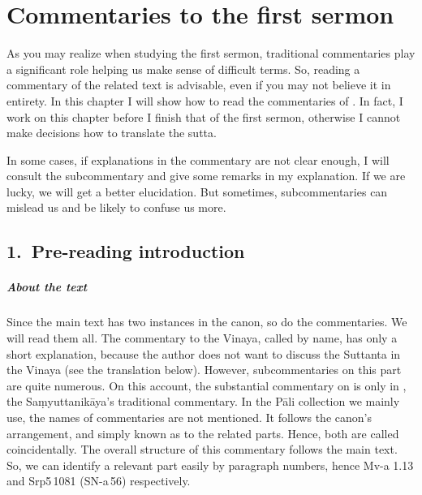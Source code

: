 \chapter{Commentaries to the first sermon}\label{chap:comcak}

As you may realize when studying the first sermon, traditional commentaries play a significant role helping us make sense of difficult terms. So, reading a commentary of the related text is advisable, even if you may not believe it in entirety. In this chapter I will show how to read the commentaries of . In fact, I work on this chapter before I finish that of the first sermon, otherwise I cannot make decisions how to translate the sutta.

In some cases, if explanations in the commentary are not clear enough, I will consult the subcommentary and give some remarks in my explanation. If we are lucky, we will get a better elucidation. But sometimes, subcommentaries can mislead us and be likely to confuse us more.

{}
\section*{1.\ Pre-reading introduction}

\paragraph*{About the text} Since the main text has two instances in the canon, so do the commentaries. We will read them all. The commentary to the Vinaya, called  by name, has only a short explanation, because the author does not want to discuss the Suttanta in the Vinaya (see the translation below). However, subcommentaries on this part are quite numerous. On this account, the substantial commentary on  is only in , the Sa\d myuttanik\=aya's traditional commentary. In the P\=ali collection we mainly use, the names of commentaries are not mentioned. It follows the canon's arrangement, and simply known as  to the related parts. Hence, both are called  coincidentally. The overall structure of this commentary follows the main text. So, we can identify a relevant part easily by paragraph numbers, hence Mv-a 1.13 and Srp5\,1081 (SN-a\,56) respectively. 

